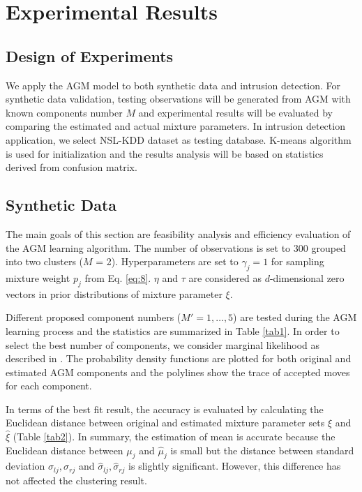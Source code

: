 \documentclass[conference]{llncs}
\begin{document}
\section{Experimental Results}
\subsection{Design of Experiments}
We apply the AGM model to both synthetic data and intrusion detection. For synthetic data validation, testing observations will be generated from AGM with known components number $M$ and experimental results will be evaluated by comparing the estimated and actual mixture parameters. In intrusion detection application, we select NSL-KDD dataset \cite{Tavallaee2009} as testing database. K-means algorithm is used for initialization and the results analysis will be based on statistics derived from confusion matrix.

\subsection{Synthetic Data}
The main goals of this section are feasibility analysis and efficiency evaluation of the AGM learning algorithm. The number of observations is set to 300 grouped into two clusters ($M$ = 2). Hyperparameters are set to $\gamma_j = 1$ \cite{Stephens2000} for sampling mixture weight $p_j$ from Eq. \eqref{eq:8}. $\eta$ and $\tau$ are considered as $d$-dimensional zero vectors in prior distributions of mixture parameter $\xi$.

Different proposed component numbers ($M' = 1,\dots,5$) are tested during the AGM learning process and the statistics are summarized in Table \ref{tab1}. In order to select the best number of components, we consider marginal likelihood as described in \cite{Bouguila2009}. The probability density functions are plotted for both original and estimated AGM components and the polylines show the trace of accepted moves for each component.

In terms of the best fit result, the accuracy is evaluated by calculating the Euclidean distance between original and estimated mixture parameter sets $\xi$ and $\hat{\xi}$ (Table \ref{tab2}). In summary, the estimation of mean is accurate because the Euclidean distance between $\mu_j$ and $\hat{\mu}_j$ is small but the distance between standard deviation $\sigma_{lj}, \sigma_{rj}$ and $\hat{\sigma}_{lj}, \hat{\sigma}_{rj}$ is slightly significant. However, this difference has not affected the clustering result.
\end{document}
